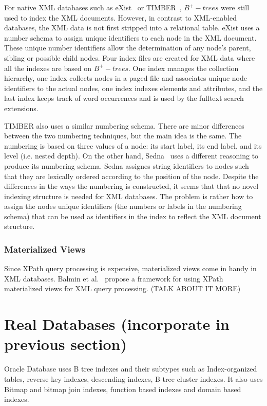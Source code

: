 \documentclass[12pt,a4paper]{article}
\begin{document}
For native XML databases such as eXist~\cite{meier2009exist} or TIMBER~\cite{jagadish2002timber}, $B^{+}-trees$ were still used to index the XML documents.
However, in contrast to XML-enabled databases, the XML data is not first stripped into a relational table. eXist uses a number schema to assign unique
identifiers to each node in the XML document. These unique number identifiers allow the determination of any node's parent, sibling or possible child nodes.
Four index files are created for XML data where all the indexes are based on $B^{+}-trees$. One index manages the collection hierarchy, one index collects nodes
in a paged file and associates unique node identifiers to the actual nodes, one index indexes elements and attributes, and the last index keeps track of word
occurrences and is used by the fulltext search extensions.


TIMBER also uses a similar numbering schema. There are minor differences between the two numbering techniques, but the main idea is the same. The numbering is
based on three values of a node: its start label, its end label, and its level (i.e. nested depth). On the other hand, Sedna~\cite{taranov2010sedna} uses a
different reasoning to produce its numbering schema. Sedna assignes string identifiers to nodes such that they are lexically ordered according to the position
of the node. Despite the differences in the ways the numbering is constructed, it seems that that no novel indexing structure is needed for XML databases. The
problem is rather how to assign the nodes unique identifiers (the numbers or labels in the numbering schema) that can be used as identifiers in the index to
reflect the XML document structure.


\subsubsection{Materialized Views}

Since XPath query processing is expensive, materialized views come in handy in XML databases. Balmin et al.~\cite{balmin2004framework} propose a framework for
using XPath materialized views for XML query processing. (TALK ABOUT IT MORE)


\section{Real Databases (incorporate in previous section)}

Oracle Database uses B tree indexes and their subtypes such as Index-organized tables, reverse key indexes, descending indexes, B-tree cluster indexes. It also
uses Bitmap and bitmap join indexes, function based indexes and domain based indexes.
\end{document}
